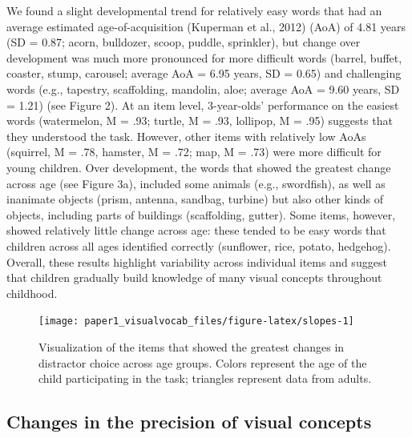 \documentclass[
  man,mask]{apa6}
\begin{document}
We found a slight developmental trend for relatively easy words that had an average estimated age-of-acquisition (Kuperman et al., 2012) (AoA) of 4.81 years (SD = 0.87; acorn, bulldozer, scoop, puddle, sprinkler), but change over development was much more pronounced for more difficult words (barrel, buffet, coaster, stump, carousel; average AoA = 6.95 years, SD = 0.65) and challenging words (e.g., tapestry, scaffolding, mandolin, aloe; average AoA = 9.60 years, SD = 1.21) (see Figure 2). At an item level, 3-year-olds' performance on the easiest words (watermelon, M = .93; turtle, M = .93, lollipop, M = .95) suggests that they understood the task. However, other items with relatively low AoAs (squirrel, M = .78, hamster, M = .72; map, M = .73) were more difficult for young children. Over development, the words that showed the greatest change across age (see Figure 3a), included some animals (e.g., swordfish), as well as inanimate objects (prism, antenna, sandbag, turbine) but also other kinds of objects, including parts of buildings (scaffolding, gutter). Some items, however, showed relatively little change across age: these tended to be easy words that children across all ages identified correctly (sunflower, rice, potato, hedgehog). Overall, these results highlight variability across individual items and suggest that children gradually build knowledge of many visual concepts throughout childhood.

\begin{figure}[H]

{\centering \texttt{[image: paper1\_visualvocab\_files/figure-latex/slopes-1]} 

}

\caption{Visualization of the items that showed the greatest changes in distractor choice across age groups. Colors represent the age of the child participating in the task; triangles represent data from adults.}\label{fig:slopes}
\end{figure}

\subsection{Changes in the precision of visual concepts}\label{changes-in-the-precision-of-visual-concepts}
\end{document}
